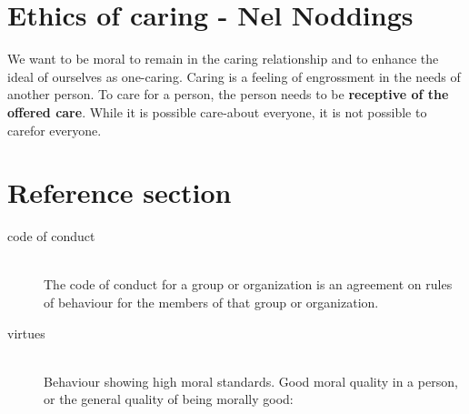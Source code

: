 \documentclass{article}
\begin{document}
\section{Ethics of caring - Nel Noddings}
\begin{flushleft}
We want to be moral to remain in the caring relationship and to enhance the ideal of ourselves as one-caring. Caring is a feeling of engrossment in the needs of another person. To care for a person, the person needs to be \textbf{receptive of the offered care}. While it is possible care-about everyone, it is not possible to carefor everyone.
\end{flushleft}

\pagebreak

\section*{Reference section} \label{sec:reference}
\begin{description}
	\item[code of conduct] \hfill \\ The code of conduct for a group or organization is an agreement on rules of behaviour for the members of that group or organization.
  \item[virtues] \hfill \\ Behaviour showing high moral standards. Good moral quality in a person, or the general quality of being morally good:
\end{description}
\end{document}
